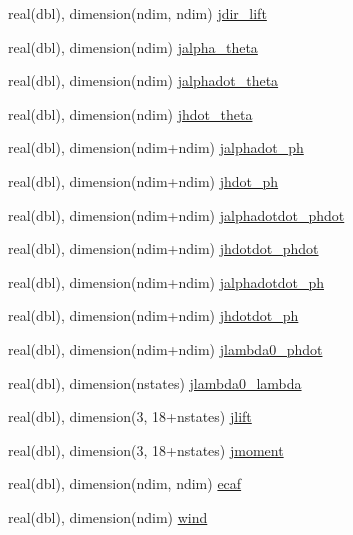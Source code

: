 \begin{DoxyCompactItemize}
\item 
real(dbl), dimension(ndim, ndim) \hyperlink{namespaceelement_a580ce3f83ad83383203449b2d8f4a3a4}{jdir\+\_\+lift}
\item 
real(dbl), dimension(ndim) \hyperlink{namespaceelement_a38bfdfabd1e6c253836e6fb02c0d6784}{jalpha\+\_\+theta}
\item 
real(dbl), dimension(ndim) \hyperlink{namespaceelement_a6c09852dc997af8b311d0ced2855794d}{jalphadot\+\_\+theta}
\item 
real(dbl), dimension(ndim) \hyperlink{namespaceelement_a8fc86f2f6fcef7f4b4216181ed52a8b7}{jhdot\+\_\+theta}
\item 
real(dbl), dimension(ndim+ndim) \hyperlink{namespaceelement_a21fa4f1bba2c9d7c57ba982869fe0a95}{jalphadot\+\_\+ph}
\item 
real(dbl), dimension(ndim+ndim) \hyperlink{namespaceelement_a9ef70f6658a771b1ae6491475da5f9c3}{jhdot\+\_\+ph}
\item 
real(dbl), dimension(ndim+ndim) \hyperlink{namespaceelement_ab9d2421c52f64e5ff0b10858aca6bd43}{jalphadotdot\+\_\+phdot}
\item 
real(dbl), dimension(ndim+ndim) \hyperlink{namespaceelement_a0928be80ffe200a8be069851f2c20dbd}{jhdotdot\+\_\+phdot}
\item 
real(dbl), dimension(ndim+ndim) \hyperlink{namespaceelement_a098f0887e0821d48cc06e45f446b9aab}{jalphadotdot\+\_\+ph}
\item 
real(dbl), dimension(ndim+ndim) \hyperlink{namespaceelement_a2ce32735f66193668003049e1cf17d61}{jhdotdot\+\_\+ph}
\item 
real(dbl), dimension(ndim+ndim) \hyperlink{namespaceelement_a7c62d3aab34ad67ea920d7293726205e}{jlambda0\+\_\+phdot}
\item 
real(dbl), dimension(nstates) \hyperlink{namespaceelement_abb09debf79a65110c87abb4892423e00}{jlambda0\+\_\+lambda}
\item 
real(dbl), dimension(3, 18+nstates) \hyperlink{namespaceelement_a2cc8d4739c02a1302e8c31d681c70eb8}{jlift}
\item 
real(dbl), dimension(3, 18+nstates) \hyperlink{namespaceelement_ac6e33874e30f493a8e29de4f0c87af0a}{jmoment}
\item 
real(dbl), dimension(ndim, ndim) \hyperlink{namespaceelement_a8cf9df9304438d7eaddcd8609c6968c5}{ecaf}
\item 
real(dbl), dimension(ndim) \hyperlink{namespaceelement_aeced564b191f69b1327f9b9164f371f5}{wind}
\end{DoxyCompactItemize}


